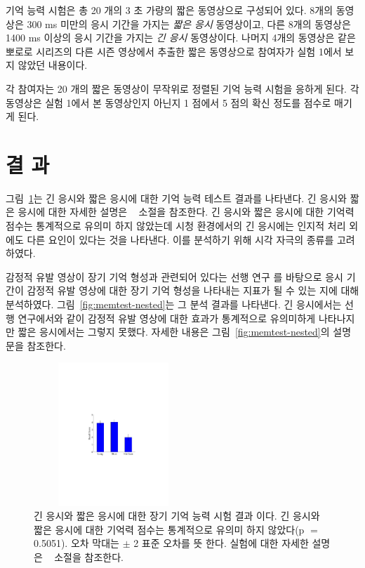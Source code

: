 \documentclass{kcc}
\begin{document}
기억 능력 시험은 총 20 개의 3 초 가량의 짧은 동영상으로 구성되어 있다. 8개의 동영상은 300 ms 미만의 응시 기간을 가지는 \textit{짧은 응시} 동영상이고, 다른 8개의 동영상은 1400 ms 이상의 응시 기간을 가지는 \textit{긴 응시} 동영상이다. 나머지 4개의 동영상은 같은 뽀로로 시리즈의 다른 시즌 영상에서 추출한 짧은 동영상으로 참여자가 실험 1에서 보지 않았던 내용이다.

각 참여자는 20 개의 짧은 동영상이 무작위로 정렬된 기억 능력 시험을 응하게 된다. 각 동영상은 실험 1에서 본 동영상인지 아닌지 1 점에서 5 점의 확신 정도를 점수로 매기게 된다. 


\section{결 과}
그림~\ref{fig:memtest-leng}는 긴 응시와 짧은 응시에 대한 기억 능력 테스트 결과를 나타낸다. 긴 응시와 짧은 응시에 대한 자세한 설명은 ~ 소절을 참조한다. 긴 응시와 짧은 응시에 대한 기억력 점수는 통계적으로 유의미 하지 않았는데 시청 환경에서의 긴 응시에는 인지적 처리 외에도 다른 요인이 있다는 것을 나타낸다. 이를 분석하기 위해 시각 자극의 종류를 고려하였다.

감정적 유발 영상이 장기 기억 형성과 관련되어 있다는 선행 연구 \cite{Cahill1996amyg,Cahill1998baso}를 바탕으로 응시 기간이 감정적 유발 영상에 대한 장기 기억 형성을 나타내는 지표가 될 수 있는 지에 대해 분석하였다. 그림~\ref{fig:memtest-nested}는 그 분석 결과를 나타낸다. 긴 응시에서는 선행 연구에서와 같이 감정적 유발 영상에 대한 효과가 통계적으로 유의미하게 나타나지만 짧은 응시에서는 그렇지 못했다. 자세한 내용은 그림~\ref{fig:memtest-nested}의 설명문을 참조한다.

\begin{figure}
  \centerline{\includegraphics[width=60mm,height=54mm,trim=65mm 103mm 68mm 100mm]{./eps/memtest_leng}}
  \caption{긴 응시와 짧은 응시에 대한 장기 기억 능력 시험 결과 이다. 긴 응시와 짧은 응시에 대한 기억력 점수는 통계적으로 유의미 하지 않았다(p $=$ 0.5051). 오차 막대는 $\pm$ 2 표준 오차를 뜻 한다. 실험에 대한 자세한 설명은 ~ 소절을 참조한다.}
  \label{fig:memtest-leng}
\end{figure}
\end{document}
